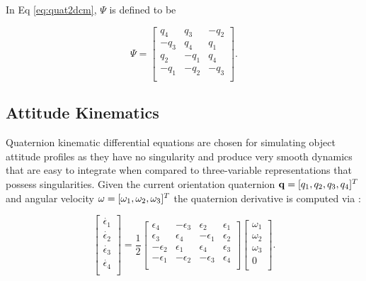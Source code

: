 In Eq \ref{eq:quat2dcm}, $\Psi$ is defined to be \cite{crassidis1ed}

\begin{equation} \label{eq:quat_psi}
    \Psi = \left[\begin{matrix}q_4&q_3&-q_2\\{-q}_3&q_4&q_1\\q_2&-q_1&q_4\\-q_1&-q_2&-q_3\\\end{matrix}\right].
\end{equation}

\subsection{Attitude Kinematics}

Quaternion kinematic differential equations are chosen for simulating object attitude profiles as they have no singularity and produce very smooth dynamics that are easy to integrate when compared to three-variable representations that possess singularities. Given the current orientation quaternion $\mathbf{q} = [q_1, q_2, q_3, q_4]^T$ and angular velocity $\mathbf{\omega} = [\omega_1, \omega_2, \omega_3]^T$ the quaternion derivative is computed via \cite{crassidis1ed}:

\begin{equation} \label{eq:quat_kde}
    \left[\begin{matrix}\dot{\epsilon_1}\\\dot{\epsilon_2}\\\dot{\epsilon_3}\\\dot{\epsilon_4}\\\end{matrix}\right]
    =
    \frac{1}{2}\left[\begin{matrix}\epsilon_4&-\epsilon_3&\epsilon_2&\epsilon_1\\\epsilon_3&\epsilon_4&-\epsilon_1&\epsilon_2\\-\epsilon_2&\epsilon_1&\epsilon_4&\epsilon_3\\-\epsilon_1&-\epsilon_2&-\epsilon_3&\epsilon_4\\\end{matrix}\right]
    \left[\begin{matrix}\omega_1\\\omega_2\\\omega_3\\0\\\end{matrix}\right].
\end{equation} 

